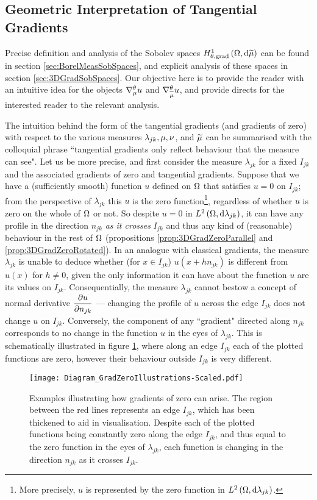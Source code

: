 \subsection{Geometric Interpretation of Tangential Gradients} \label{ssec:3DGradGeometric}
Precise definition and analysis of the Sobolev spaces $H^1_{\theta, \mathrm{grad}}\left( \Omega, \mathrm{d}\widetilde{\mu} \right)$ can be found in section \ref{sec:BorelMeasSobSpaces}, and explicit analysis of these spaces in section \ref{sec:3DGradSobSpaces}.
Our objective here is to provide the reader with an intuitive idea for the objects $\nabla^{\theta}_{\mu}u$ and $\nabla^{\theta}_{\widetilde{\mu}}u$, and provide directs for the interested reader to the relevant analysis.

The intuition behind the form of the tangential gradients (and gradients of zero) with respect to the various measures $\lambda_{jk}, \mu, \nu$, and $\widetilde{\mu}$ can be summarised with the colloquial phrase ``tangential gradients only reflect behaviour that the measure can see".
Let us be more precise, and first consider the measure $\lambda_{jk}$ for a fixed $I_{jk}$ and the associated gradients of zero and tangential gradients.
Suppose that we have a (sufficiently smooth) function $u$ defined on $\Omega$ that satisfies $u=0$ on $I_{jk}$; from the perspective of $\lambda_{jk}$ this $u$ is the zero function\footnote{More precisely, $u$ is represented by the zero function in $L^{2}\left( \Omega,\mathrm{d} \lambda_{jk} \right)$.}, regardless of whether $u$ is zero on the whole of $\Omega$ or not.
So despite $u=0$ in $L^{2}\left( \Omega,\mathrm{d} \lambda_{jk} \right)$, it can have any profile in the direction $n_{jk}$ \emph{as it crosses} $I_{jk}$ and thus any kind of (reasonable) behaviour in the rest of $\Omega$ (propositions \ref{prop:3DGradZeroParallel} and \ref{prop:3DGradZeroRotated}).
In an analogue with classical gradients, the measure $\lambda_{jk}$ is unable to deduce whether (for $x\in I_{jk}$) $u(x+hn_{jk})$ is different from $u(x)$ for $h\neq0$, given the only information it can have about the function $u$ are its values on $I_{jk}$.
Consequentially, the measure $\lambda_{jk}$ cannot bestow a concept of normal derivative $\dfrac{\partial u}{\partial n_{jk}}$ --- changing the profile of $u$ across the edge $I_{jk}$ does not change $u$ on $I_{jk}$.
Conversely, the component of any ``gradient" directed along $n_{jk}$ corresponds to no change in the function $u$ in the eyes of $\lambda_{jk}$.
This is schematically illustrated in figure \ref{fig:Diagram_GradZeroIllustrations}, where along an edge $I_{jk}$ each of the plotted functions are zero, however their behaviour outside $I_{jk}$ is very different.
\begin{figure}[b!]
	\centering
	\texttt{[image: Diagram\_GradZeroIllustrations-Scaled.pdf]}
	\caption{\label{fig:Diagram_GradZeroIllustrations} Examples illustrating how gradients of zero can arise. The region between the red lines represents an edge $I_{jk}$, which has been thickened to aid in visualisation. Despite each of the plotted functions being constantly zero along the edge $I_{jk}$, and thus equal to the zero function in the eyes of $\lambda_{jk}$, each function is changing in the direction $n_{jk}$ as it crosses $I_{jk}$.}
\end{figure}
